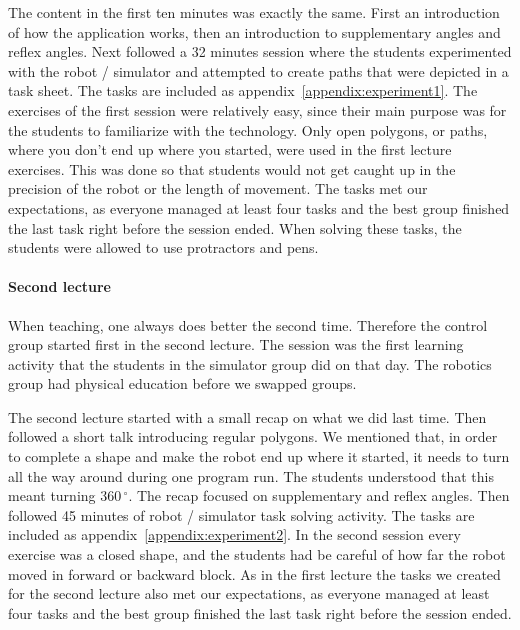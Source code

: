 \bigskip\noindent
The content in the first ten minutes was exactly the same. First an introduction of how the application works, then an introduction to supplementary angles and reflex angles. Next followed a 32 minutes session where the students experimented with the robot / simulator and attempted to create paths that were depicted in a task sheet. The tasks are included as appendix~\ref{appendix:experiment1}.
The exercises of the first session were relatively easy, since their main purpose was for the students to familiarize with the technology.
Only open polygons, or paths, where you don't end up where you started, were used in the first lecture exercises. This was done so that students would not get caught up in the precision of the robot or the length of movement.
The tasks met our expectations, as everyone managed at least four tasks and the best group finished the last task right before the session ended. When solving these tasks, the students were allowed to use protractors and pens. 


\paragraph{Second lecture}
When teaching, one always does better the second time.
Therefore the control group started first in the second lecture.
The session was the first learning activity that the students in the simulator group did on that day. 
The robotics group had physical education before we swapped groups.

\bigskip\noindent
The second lecture started with a small recap on what we did last time. Then followed a short talk introducing regular polygons. We mentioned that, in order to complete a shape and make the robot end up where it started, it needs to turn all the way around during one program run. The students understood that this meant turning $360\,^{\circ}$. The recap focused on supplementary and reflex angles. Then followed 45 minutes of robot / simulator task solving activity. The tasks are included as appendix~\ref{appendix:experiment2}.
In the second session every exercise was a closed shape, and the students had be careful of how far the robot moved in forward or backward block. 
As in the first lecture the tasks we created for the second lecture also met our expectations, as everyone managed at least four tasks and the best group finished the last task right before the session ended.  